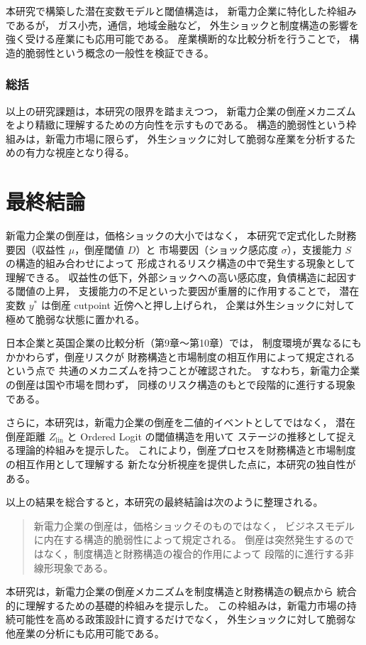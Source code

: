 本研究で構築した潜在変数モデルと閾値構造は，
新電力企業に特化した枠組みであるが，
ガス小売，通信，地域金融など，
外生ショックと制度構造の影響を強く受ける産業にも応用可能である。
産業横断的な比較分析を行うことで，
構造的脆弱性という概念の一般性を検証できる。


\subsubsection*{総括}

以上の研究課題は，本研究の限界を踏まえつつ，
新電力企業の倒産メカニズムをより精緻に理解するための方向性を示すものである。
構造的脆弱性という枠組みは，新電力市場に限らず，
外生ショックに対して脆弱な産業を分析するための有力な視座となり得る。


\section{最終結論}

新電力企業の倒産は，価格ショックの大小ではなく，
本研究で定式化した財務要因（収益性 $\mu$，倒産閾値 $D$）と
市場要因（ショック感応度 $\sigma$），支援能力 $S$ の構造的組み合わせによって
形成されるリスク構造の中で発生する現象として理解できる。
収益性の低下，外部ショックへの高い感応度，負債構造に起因する閾値の上昇，
支援能力の不足といった要因が重層的に作用することで，
潜在変数 $y^*$ は倒産 cutpoint 近傍へと押し上げられ，
企業は外生ショックに対して極めて脆弱な状態に置かれる。

日本企業と英国企業の比較分析（第9章〜第10章）では，
制度環境が異なるにもかかわらず，倒産リスクが
財務構造と市場制度の相互作用によって規定されるという点で
共通のメカニズムを持つことが確認された。
すなわち，新電力企業の倒産は国や市場を問わず，
同様のリスク構造のもとで段階的に進行する現象である。

さらに，本研究は，新電力企業の倒産を二値的イベントとしてではなく，
潜在倒産距離 \(Z_{\text{lin}}\) と Ordered Logit の閾値構造を用いて
ステージの推移として捉える理論的枠組みを提示した。
これにより，倒産プロセスを財務構造と市場制度の相互作用として理解する
新たな分析視座を提供した点に，本研究の独自性がある。

以上の結果を総合すると，本研究の最終結論は次のように整理される。

\begin{quote}
新電力企業の倒産は，価格ショックそのものではなく，
ビジネスモデルに内在する構造的脆弱性によって規定される。
倒産は突然発生するのではなく，制度構造と財務構造の複合的作用によって
段階的に進行する非線形現象である。
\end{quote}

本研究は，新電力企業の倒産メカニズムを制度構造と財務構造の観点から
統合的に理解するための基礎的枠組みを提示した。
この枠組みは，新電力市場の持続可能性を高める政策設計に資するだけでなく，
外生ショックに対して脆弱な他産業の分析にも応用可能である。
